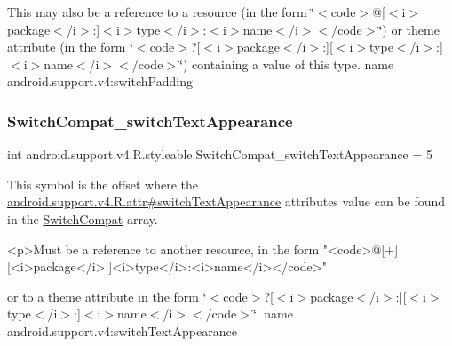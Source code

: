 This may also be a reference to a resource (in the form \char`\"{}$<$code$>$@\mbox{[}$<$i$>$package$<$/i$>$\+:\mbox{]}$<$i$>$type$<$/i$>$\+:$<$i$>$name$<$/i$>$$<$/code$>$\char`\"{}) or theme attribute (in the form \char`\"{}$<$code$>$?\mbox{[}$<$i$>$package$<$/i$>$\+:\mbox{]}\mbox{[}$<$i$>$type$<$/i$>$\+:\mbox{]}$<$i$>$name$<$/i$>$$<$/code$>$\char`\"{}) containing a value of this type.  name android.\+support.\+v4\+:switch\+Padding \mbox{\label{classandroid_1_1support_1_1v4_1_1R_1_1styleable_ab4c597f326c0384743a43b0b9438e39c}} 
\subsubsection{\texorpdfstring{Switch\+Compat\+\_\+switch\+Text\+Appearance}{SwitchCompat\_switchTextAppearance}}
{\footnotesize\ttfamily int android.\+support.\+v4.\+R.\+styleable.\+Switch\+Compat\+\_\+switch\+Text\+Appearance = 5\hspace{0.3cm}{\ttfamily [static]}}

This symbol is the offset where the \hyperlink{classandroid_1_1support_1_1v4_1_1R_1_1attr_a1b21b5a978f7e9880ff0cb866c5c1225}{android.\+support.\+v4.\+R.\+attr\#switch\+Text\+Appearance} attribute\textquotesingle{}s value can be found in the \hyperlink{classandroid_1_1support_1_1v4_1_1R_1_1styleable_a3b46a9ea84acdcc1d9e88a54fc6f685e}{Switch\+Compat} array.

\begin{DoxyVerb}      <p>Must be a reference to another resource, in the form "<code>@[+][<i>package</i>:]<i>type</i>:<i>name</i></code>"
\end{DoxyVerb}
 or to a theme attribute in the form \char`\"{}$<$code$>$?\mbox{[}$<$i$>$package$<$/i$>$\+:\mbox{]}\mbox{[}$<$i$>$type$<$/i$>$\+:\mbox{]}$<$i$>$name$<$/i$>$$<$/code$>$\char`\"{}.  name android.\+support.\+v4\+:switch\+Text\+Appearance \mbox{\label{classandroid_1_1support_1_1v4_1_1R_1_1styleable_adc6c78ef9566075a82031ccba51bd4ea}} 
